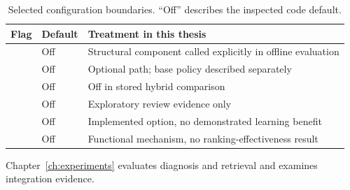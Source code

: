 \begin{table}[htbp]
\centering\footnotesize
\caption{Selected configuration boundaries. ``Off'' describes the inspected code default.}
\label{tab:flags}
\begin{tabularx}{\textwidth}{p{50mm}lY}
\toprule
Flag & Default & Treatment in this thesis\\
\midrule
{} & Off & Structural component called explicitly in offline evaluation\\
 & Off & Optional path; base policy described separately\\
 & Off & Off in stored hybrid comparison\\
 & Off & Exploratory review evidence only\\
 & Off & Implemented option, no demonstrated learning benefit\\
 & Off & Functional mechanism, no ranking-effectiveness result\\
\bottomrule
\end{tabularx}
\end{table}

Chapter~\ref{ch:experiments} evaluates diagnosis and retrieval and examines integration evidence.
